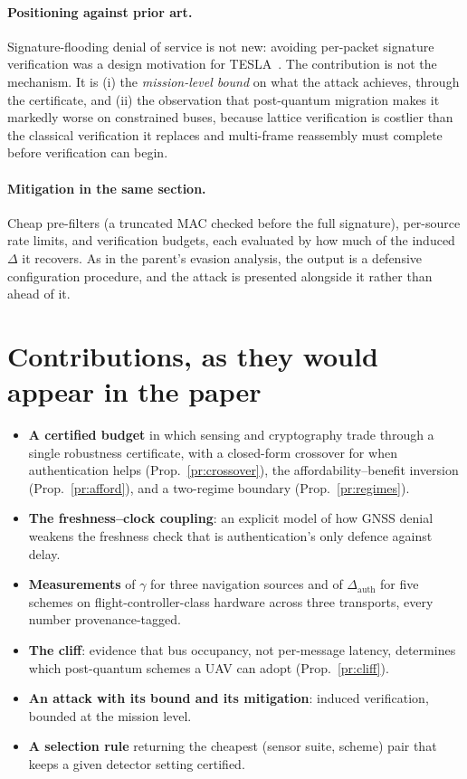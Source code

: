 \documentclass[11pt,a4paper]{article}
\newcommand{\Dauth}{\Delta_{\mathrm{auth}}}
\begin{document}
\paragraph{Positioning against prior art.} Signature-flooding denial of service
is not new: avoiding per-packet signature verification was a design motivation
for TESLA~\cite{perrig2000tesla}. The contribution is not the mechanism. It is
(i) the \emph{mission-level bound} on what the attack achieves, through the
certificate, and (ii) the observation that post-quantum migration makes it
markedly worse on constrained buses, because lattice verification is costlier
than the classical verification it replaces and multi-frame reassembly must
complete before verification can begin.

\paragraph{Mitigation in the same section.} Cheap pre-filters (a truncated MAC
checked before the full signature), per-source rate limits, and verification
budgets, each evaluated by how much of the induced $\Delta$ it recovers. As in
the parent's evasion analysis, the output is a defensive configuration
procedure, and the attack is presented alongside it rather than ahead of it.

\section{Contributions, as they would appear in the paper}
\begin{itemize}
\item \textbf{A certified budget} in which sensing and cryptography trade
  through a single robustness certificate, with a closed-form crossover for when
  authentication helps (Prop.~\ref{pr:crossover}), the affordability--benefit
  inversion (Prop.~\ref{pr:afford}), and a two-regime boundary
  (Prop.~\ref{pr:regimes}).
\item \textbf{The freshness--clock coupling}: an explicit model of how GNSS
  denial weakens the freshness check that is authentication's only defence
  against delay.
\item \textbf{Measurements} of $\gamma$ for three navigation sources and of
  $\Dauth$ for five schemes on flight-controller-class hardware across three
  transports, every number provenance-tagged.
\item \textbf{The cliff}: evidence that bus occupancy, not per-message latency,
  determines which post-quantum schemes a UAV can adopt
  (Prop.~\ref{pr:cliff}).
\item \textbf{An attack with its bound and its mitigation}: induced verification,
  bounded at the mission level.
\item \textbf{A selection rule} returning the cheapest (sensor suite, scheme)
  pair that keeps a given detector setting certified.
\end{itemize}
\end{document}
